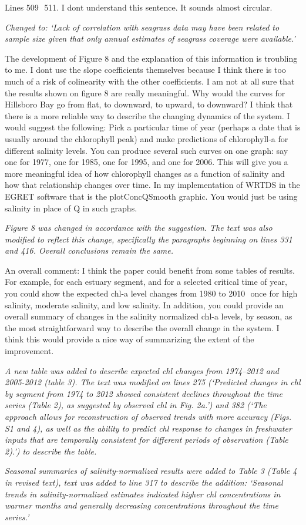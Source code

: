 \documentclass[letterpaper,12pt,oneside]{article}\usepackage[]{graphicx}\usepackage[]{color}
\begin{document}
Lines 509  511.  I dont understand this sentence.  It sounds almost circular.

\textit{Changed to: `Lack of correlation with seagrass data may have been related to sample size given that only annual estimates of seagrass coverage were available.'}

The development of Figure 8 and the explanation of this information is troubling to me.  I dont use the slope coefficients themselves because I think there is too much of a risk of colinearity with the other coefficients.  I am not at all sure that the results shown on figure 8 are really meaningful.  Why would the curves for Hillsboro Bay go from flat, to downward, to upward, to downward?  I think that there is a more reliable way to describe the changing dynamics of the system.  I would suggest the following:  Pick a particular time of year (perhaps a date that is usually around the chlorophyll peak) and make predictions of chlorophyll-a for different salinity levels.  You can produce several such curves on one graph: say one for 1977, one for 1985, one for 1995, and one for 2006.  This will give you a more meaningful idea of how chlorophyll changes as a function of salinity and how that relationship changes over time.  In my implementation of WRTDS in the EGRET software that is the plotConcQSmooth graphic.  You would just be using salinity in place of Q in such graphs.

\textit{Figure 8 was changed in accordance with the suggestion.  The text was also modified to reflect this change, specifically the paragraphs beginning on lines 331 and 416.  Overall conclusions remain the same.}

An overall comment:  I think the paper could benefit from some tables of results.  For example, for each estuary segment, and for a selected critical time of year, you could show the expected chl-a level changes from 1980 to 2010  once for high salinity, moderate salinity, and low salinity.  In addition, you could provide an overall summary of changes in the salinity normalized chl-a levels, by season, as the most straightforward way to describe the overall change in the system.  I think this would provide a nice way of summarizing the extent of the improvement.  

\textit{A new table was added to describe expected \ac{chl} changes from 1974--2012 and 2005-2012 (table 3).  The text was modified on lines 275 (`Predicted changes in \ac{chl} by segment from 1974 to 2012 showed consistent declines throughout the time series (Table 2), as suggested by observed \ac{chl} in Fig. 2a.') and 382 (`The approach allows for reconstruction of observed trends  with more accuracy (Figs. S1 and 4), as well as the ability to predict \ac{chl} response to changes in freshwater inputs that are temporally consistent for different periods of observation (Table 2).') to describe the table.}

\textit{Seasonal summaries of salinity-normalized results were added to Table 3 (Table 4 in revised text), text was added to line 317 to describe the addition: `Seasonal trends in salinity-normalized estimates indicated higher \ac{chl} concentrations in warmer months and generally decreasing concentrations throughout the time series.'}
\end{document}
